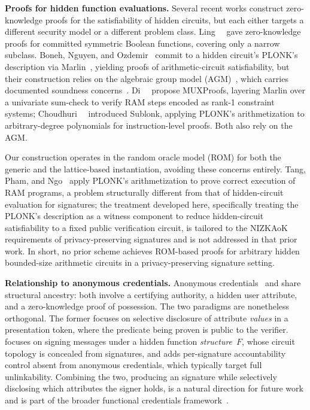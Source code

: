 \medskip
\noindent\textbf{Proofs for hidden function evaluations.}
Several recent works construct zero-knowledge proofs
for the satisfiability of hidden circuits,
but each either targets a different security model or a different problem class.
Ling~\etal~\cite{PQCRYPTO:LNPTW21} gave zero-knowledge proofs
for committed symmetric Boolean functions,
covering only a narrow subclass.
Boneh, Nguyen, and Ozdemir~\cite{EPRINT:BonNguOzd21} commit to
a hidden circuit's PLONK's description via Marlin~\cite{EC:CHMMVW20},
yielding proofs of arithmetic-circuit satisfiability,
but their construction relies on the algebraic group model (AGM)~\cite{CRYPTO:FucKilLos18},
which carries documented soundness concerns~\cite{AC:ZhaZhoKat22}.
Di~\etal~\cite{AC:DXNT24} propose MUXProofs,
layering Marlin over a univariate sum-check to verify RAM steps encoded as rank-1 constraint systems;
Choudhuri~\etal~\cite{PETS:CGGSS24} introduced Sublonk,
applying PLONK's arithmetization to arbitrary-degree polynomials
for instruction-level proofs.
Both also rely on the AGM.

Our construction operates in the random oracle model (ROM) for both
the generic and the lattice-based instantiation, avoiding these concerns entirely.
Tang, Pham, and Ngo~\cite{EPRINT:TanPhaNgo24} apply PLONK's arithmetization
to prove correct execution of RAM programs,
a problem structurally different from that of hidden-circuit evaluation for signatures;
the treatment developed here, specifically treating the PLONK's description
as a witness component to reduce hidden-circuit satisfiability
to a fixed public verification circuit,
is tailored to the NIZKAoK requirements of privacy-preserving signatures
and is not addressed in that prior work.
In short, no prior scheme achieves ROM-based proofs
for arbitrary hidden bounded-size arithmetic circuits
in a privacy-preserving signature setting.

\medskip
\noindent\textbf{Relationship to anonymous credentials.}
Anonymous credentials~\cite{SJ:AuSMC13,EC:CamLys01,CRYPTO:CamLys04} and \SMS share structural ancestry:
both involve a certifying authority, a hidden user attribute,
and a zero-knowledge proof of possession.
The two paradigms are nonetheless orthogonal.
The former focuses on selective disclosure of attribute \emph{values}
in a presentation token, where the predicate being proven is public to the verifier.
\SMS focuses on signing messages under a hidden function \emph{structure}~$F$,
whose circuit topology is concealed from signatures,
and adds per-signature accountability control absent from anonymous credentials,
which typically target full unlinkability.
Combining the two, producing an \SMS signature while selectively disclosing
which attributes the signer holds, is a natural direction for future work
and is part of the broader functional credentials framework~\cite{iotpts/Chow16}.